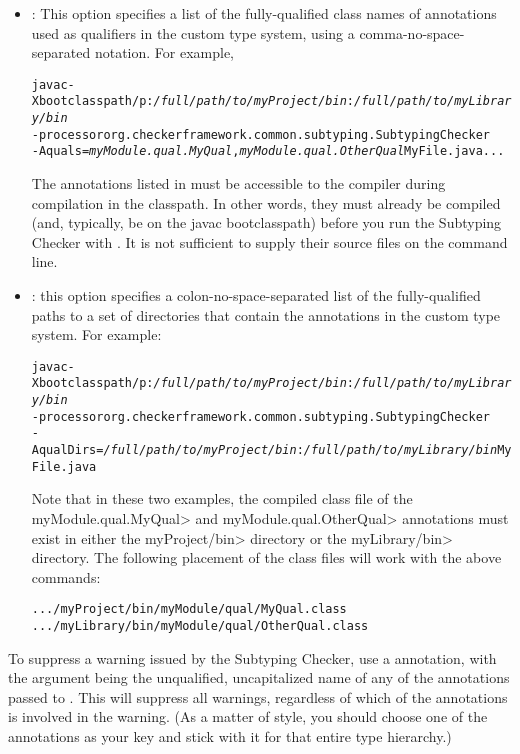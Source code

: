 \begin{itemize}

\item
{}: This option specifies a list of the fully-qualified class names
of annotations used as qualifiers in the custom type system, using a
comma-no-space-separated notation. For example,

\begin{alltt}
  javac -Xbootclasspath/p:\textit{/full/path/to/myProject/bin}:\textit{/full/path/to/myLibrary/bin} \ttbs
        -processor org.checkerframework.common.subtyping.SubtypingChecker \ttbs
        -Aquals=\textit{myModule.qual.MyQual},\textit{myModule.qual.OtherQual} MyFile.java ...
\end{alltt}

The annotations listed in  must be accessible to
the compiler during compilation in the classpath.  In other words, they must
already be compiled (and, typically, be on the javac bootclasspath)
before you run the Subtyping Checker with .  It
is not sufficient to supply their source files on the command line.

\item
{}: this option specifies a colon-no-space-separated list of
the fully-qualified paths to a set of directories that contain the annotations
in the custom type system. For example:

\begin{alltt}
  javac -Xbootclasspath/p:\textit{/full/path/to/myProject/bin}:\textit{/full/path/to/myLibrary/bin} \ttbs
        -processor org.checkerframework.common.subtyping.SubtypingChecker \ttbs
        -AqualDirs=\textit{/full/path/to/myProject/bin}:\textit{/full/path/to/myLibrary/bin} MyFile.java
\end{alltt}

Note that in these two examples, the compiled class file of the
\<myModule.qual.MyQual> and \<myModule.qual.OtherQual> annotations must exist
in either the \<myProject/bin> directory or the \<myLibrary/bin> directory. The
following placement of the class files will work with the above commands:

\begin{alltt}
  .../myProject/bin/myModule/qual/MyQual.class
  .../myLibrary/bin/myModule/qual/OtherQual.class
\end{alltt}

\end{itemize}

To suppress a warning issued by the Subtyping Checker, use a
annotation, with the argument being the unqualified, uncapitalized name of
any of the annotations passed to .  This will suppress all
warnings, regardless of which of the annotations is involved in the
warning.  (As a matter of style, you should choose one of the annotations
as your  key and stick with it for that entire type
hierarchy.)


